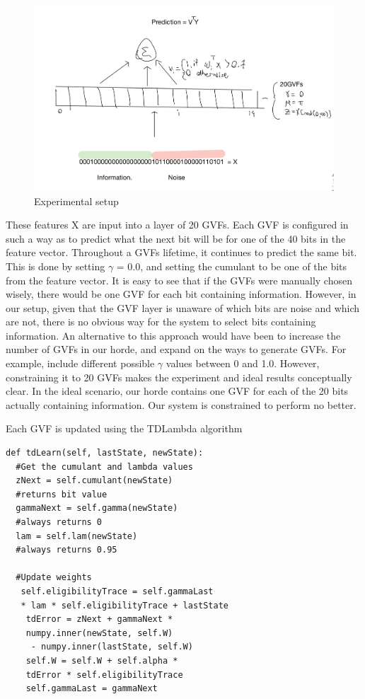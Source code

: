 \documentclass[letterpaper]{article}
\begin{document}
\begin{figure}[H]
  \centerline{\includegraphics[width=\linewidth]{Images/ExperimentSetup.png}}
  \caption{Experimental setup}
  \label{fig:experiment}
\end{figure}

These features X are input into a layer of 20 GVFs. Each GVF is configured in such a way as to predict what the next bit will be for one of the 40 bits in the feature vector. Throughout a GVFs lifetime, it continues to predict the same bit. This is done by setting $\gamma$ = 0.0, and setting the cumulant to be one of the bits from the feature vector. It is easy to see that if the GVFs were manually chosen wisely, there would be one GVF for each bit containing information. However, in our setup, given that the GVF layer is unaware of which bits are noise and which are not, there is no obvious way for the system to select bits containing information. An alternative to this approach would have been to increase the number of GVFs in our horde, and expand on the ways to generate GVFs. For example, include different possible $\gamma$ values between 0 and 1.0. However, constraining it to 20 GVFs makes the experiment and ideal results conceptually clear. In the ideal scenario, our horde contains one GVF for each of the 20 bits actually containing information. Our system is constrained to perform no better.

Each GVF is updated using the TDLambda algorithm

\begin{lstlisting}
def tdLearn(self, lastState, newState):
  #Get the cumulant and lambda values
  zNext = self.cumulant(newState)  
  #returns bit value
  gammaNext = self.gamma(newState) 
  #always returns 0
  lam = self.lam(newState) 
  #always returns 0.95

  #Update weights
   self.eligibilityTrace = self.gammaLast 
   * lam * self.eligibilityTrace + lastState
    tdError = zNext + gammaNext * 
    numpy.inner(newState, self.W) 
     - numpy.inner(lastState, self.W)
    self.W = self.W + self.alpha * 
    tdError * self.eligibilityTrace
    self.gammaLast = gammaNext
\end{lstlisting}
\end{document}
